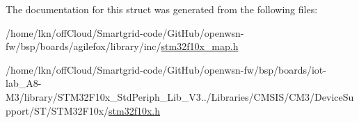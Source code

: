 The documentation for this struct was generated from the following files\+:\begin{DoxyCompactItemize}
\item 
/home/lkn/off\+Cloud/\+Smartgrid-\/code/\+Git\+Hub/openwsn-\/fw/bsp/boards/agilefox/library/inc/\hyperlink{agilefox_2library_2inc_2stm32f10x__map_8h}{stm32f10x\+\_\+map.\+h}\item 
/home/lkn/off\+Cloud/\+Smartgrid-\/code/\+Git\+Hub/openwsn-\/fw/bsp/boards/iot-\/lab\+\_\+\+A8-\/\+M3/library/\+S\+T\+M32\+F10x\+\_\+\+Std\+Periph\+\_\+\+Lib\+\_\+\+V3../\+Libraries/\+C\+M\+S\+I\+S/\+C\+M3/\+Device\+Support/\+S\+T/\+S\+T\+M32\+F10x/\hyperlink{iot-lab___a8-_m3_2library_2_s_t_m32_f10x___std_periph___lib___v3_85_80_2_libraries_2_c_m_s_i_s_26497265545392eb5694b064ae15018db}{stm32f10x.\+h}\end{DoxyCompactItemize}
